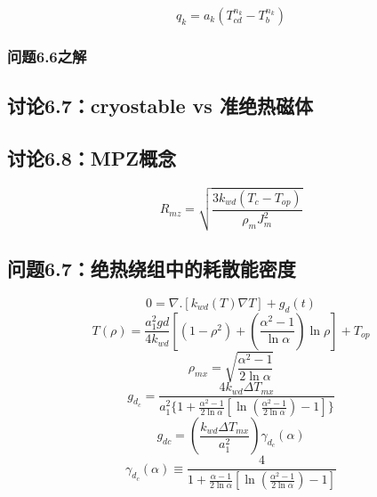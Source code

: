 \begin{equation}%
q_k=a_k(T^{n_k}_{cd}-T^{n_k}_b)
\end{equation}
\subsubsection{问题6.6之解}



\subsection{讨论6.7：cryostable vs 准绝热磁体}



\subsection{讨论6.8：MPZ概念}



\begin{equation}%
R_{mz}=\sqrt{\frac{3k_{wd}(T_c-T_{op})}{\rho_mJ_m^2}}
\end{equation}



\subsection{问题6.7：绝热绕组中的耗散能密度}

\begin{equation}%
0=\nabla.[k_{wd}(T)\nabla T]+g_d(t)
\end{equation}
\begin{equation}%
T(\rho)=\frac{a_1^2gd}{4k_{wd}}[(1-\rho^2)+(\frac{\alpha^2-1}{\ln \alpha})\ln\rho]+T_{op}
\end{equation}
\begin{equation}%
\rho_{mx}=\sqrt{\frac{\alpha^2-1}{2\ln \alpha}}
\end{equation}
\begin{equation}%
g_{d_c}=\frac{4k_{wd}\Delta T_{mx}}{a_1^2\{1+\frac{\alpha^2-1}{2\ln \alpha}[\ln{(\frac{\alpha^2-1}{2\ln\alpha})}-1]\}}
\end{equation}
\begin{equation}%
g_{dc}=(\frac{k_{wd}\Delta T_{mx}}{a_1^2})\gamma_{d_c}(\alpha)
\end{equation}
\begin{equation}%
\gamma_{d_c}(\alpha)\equiv\frac{4}{1+\frac{\alpha-1}{2\ln\alpha}[\ln(\frac{\alpha^2-1}{2\ln\alpha})-1]}
\end{equation}


